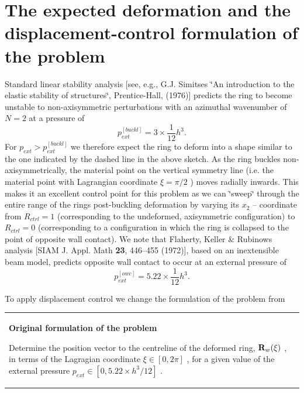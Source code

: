 \hypertarget{index_theory}{}\section{The expected deformation and the displacement-\/control formulation of the problem}\label{index_theory}
Standard linear stability analysis \mbox{[}see, e.\+g., G.\+J. Simitses \char`\"{}\+An introduction to the elastic stability of 
structures\char`\"{}, Prentice-\/\+Hall, (1976)\mbox{]} predicts the ring to become unstable to non-\/axisymmetric perturbations with an azimuthal wavenumber of $ N=2 $ at a pressure of \[ p_{ext}^{[buckl]} = 3 \times \frac{1}{12} h^3. \] For $ p_{ext} > p_{ext}^{[buckl]} $ we therefore expect the ring to deform into a shape similar to the one indicated by the dashed line in the above sketch. As the ring buckles non-\/axisymmetrically, the material point on the vertical symmetry line (i.\+e. the material point with Lagrangian coordinate $ \xi=\pi/2$ ) moves radially inwards. This makes it an excellent control point for this problem as we can \char`\"{}sweep\char`\"{} through the entire range of the ring\textquotesingle{}s post-\/buckling deformation by varying its $ x_2 $ -- coordinate from $ R_{ctrl} =1 $ (corresponding to the undeformed, axisymmetric configuration) to $ R_{ctrl} = 0 $ (corresponding to a configuration in which the ring is collapsed to the point of opposite wall contact). We note that Flaherty, Keller \& Rubinow\textquotesingle{}s analysis \mbox{[}S\+I\+AM J. Appl. Math {\bfseries 23}, 446--455 (1972)\mbox{]}, based on an inextensible beam model, predicts opposite wall contact to occur at an external pressure of \[ p_{ext}^{[owc]} = 5.22 \times \frac{1}{12} h^3. \]

To apply displacement control we change the formulation of the problem from \begin{center} \tabulinesep=1mm
\begin{longtabu} spread 0pt [c]{*{1}{|X[-1]}|}
\hline


\begin{center} {\bfseries  Original formulation of the problem} \end{center} 

Determine the position vector to the centreline of the deformed ring, $ {\bf R}_w(\xi) $ , in terms of the Lagragian coordinate $ \xi \in [0,2\pi] $ , for a given value of the external pressure $ p_{ext} \in [0, 5.22 \times h^3/12] $ . ~\newline
  \\
\end{longtabu}
\end{center} 

